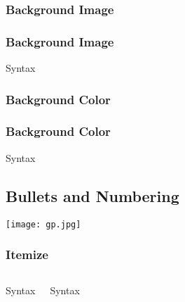 \documentclass{beamer}
\begin{document}
            \subsubsection{Background Image}
                \begin{frame}[shrink]
                \frametitle{Background Image}                    
                \transwipe
                    \begin{block}{Syntax}
                        
                    \end{block}
                \end{frame}

            \subsubsection{Background Color}
                    \begin{frame}[shrink]
                    \frametitle{Background Color}
                    \transboxin
                        \begin{block}{Syntax}
                            
                        \end{block}
                    \end{frame}

            \subsection{Bullets and Numbering}
            {\texttt{[image: gp.jpg]}}
                \begin{frame}
                \frametitle{Itemize}
                \transboxout
                    \begin{columns}
                        \begin{block}{Syntax}
                            
                        \end{block}
            
                        \begin{block}{Syntax}
                            
                        \end{block}
                    \end{columns}
                \end{frame}
\end{document}
